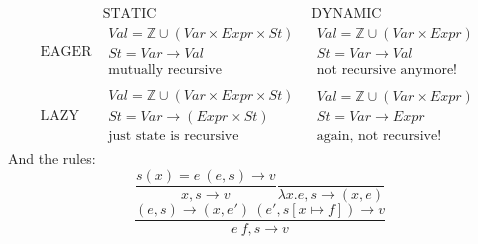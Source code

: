 \documentclass{article}
\begin{document}
$$
\begin{array}{c|c|c}
& \text{STATIC}& \text{DYNAMIC}\\\hline
\text{EAGER} &
	\begin{matrix}
		Val=\mathbb{Z}\cup (Var\times Expr\times St)\\
		St=Var\rightarrow Val\\
		\text{mutually recursive}
	\end{matrix} &
	\begin{matrix}
		Val=\mathbb{Z}\cup (Var\times Expr)\\
		St=Var\rightarrow Val\\
		\text{not recursive anymore!}
	\end{matrix}\\\hline
\text{LAZY} &
	\begin{matrix}
		Val=\mathbb{Z}\cup (Var\times Expr\times St)\\
		St=Var\rightarrow (Expr \times St)\\
		\text{just state is recursive}
	\end{matrix} &
	\begin{matrix}
		Val=\mathbb{Z}\cup (Var\times Expr)\\
		St=Var\rightarrow Expr\\
		\text{again, not recursive!}
	\end{matrix}
\end{array}
$$
And the rules:
$$
\frac{s(x)=e\ (e,s)\rightarrow v}{x,s\rightarrow v}
\frac{}{\lambda x.e,s\rightarrow (x, e)}$$$$
\frac{(e, s)\rightarrow (x, e')\ (e', s[x\mapsto f])\rightarrow v}{e\ f,s\rightarrow v}$$
\end{document}
